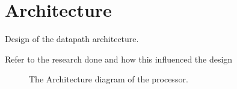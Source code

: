 

\chapter{Architecture}


Design of the datapath architecture.

Refer to the research done and how this influenced the design


\begin{figure}
\vspace*{-1.5in}
\caption{The Architecture diagram of the processor.}
\label{fig:architecture}
\end{figure}

